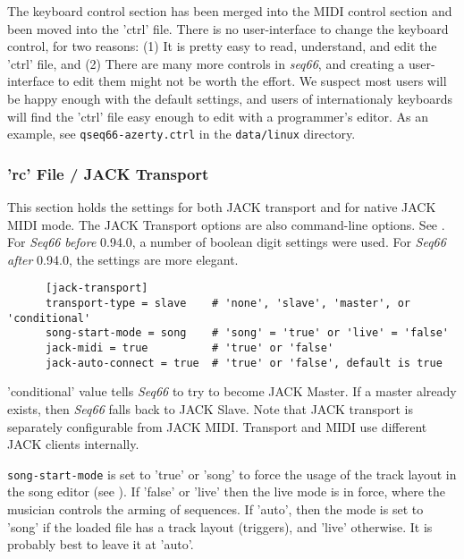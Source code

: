    The keyboard control section has been merged into the MIDI control section
   and been moved into the 'ctrl' file.
   There is no user-interface to change the
   keyboard control, for two reasons:
   (1) It is pretty easy to read, understand, and edit the 'ctrl' file, and
   (2) There are many more controls in \textsl{seq66}, and creating a
   user-interface to edit them might not be worth the effort.
   We suspect most users will be happy enough with the default settings,
   and users of internationaly keyboards will find the 'ctrl' file easy enough
   to edit with a programmer's editor.  As an example,
   see \texttt{qseq66-azerty.ctrl} in the \texttt{data/linux}
   directory.
        
\subsubsection{'rc' File / JACK Transport}
\label{subsubsec:configuration_rc_jack_transport}

   This section holds the settings for both JACK transport and for native JACK
   MIDI mode.
   The JACK Transport options are also command-line options.
   See .
   For \textsl{Seq66} \textsl{before} 0.94.0, a number of boolean digit settings
   were used.
   For \textsl{Seq66} \textsl{after} 0.94.0, the settings are more elegant.

   \begin{verbatim}
      [jack-transport]
      transport-type = slave    # 'none', 'slave', 'master', or 'conditional'
      song-start-mode = song    # 'song' = 'true' or 'live' = 'false'
      jack-midi = true          # 'true' or 'false'
      jack-auto-connect = true  # 'true' or 'false', default is true
   \end{verbatim}

   'conditional' value tells \textsl{Seq66} to try to
   become JACK Master.  If a master already exists, then \textsl{Seq66} falls
   back to JACK Slave.
   Note that JACK transport is separately configurable from
   JACK MIDI. Transport and MIDI use different JACK clients internally.

   \texttt{song-start-mode} is set to 'true' or 'song' to force the usage of the
   track layout in the song editor (see ).
   If 'false' or 'live' then the live mode is in force, where the musician
   controls the arming of sequences.
   If 'auto', then the mode is set to 'song' if the loaded file has
   a track layout (triggers), and 'live' otherwise.
   It is probably best to leave it at 'auto'.

